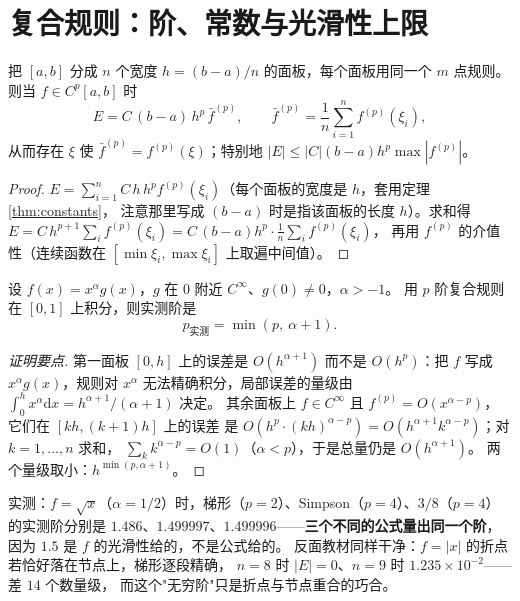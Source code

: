 \section{复合规则：阶、常数与光滑性上限}

\begin{theorem}[复合规则的误差]
\label{thm:composite}
把 $[a,b]$ 分成 $n$ 个宽度 $h=(b-a)/n$ 的面板，每个面板用同一个 $m$ 点规则。
则当 $f\in C^{p}[a,b]$ 时
\[
  E=C\,(b-a)\,h^{p}\,\bar f^{(p)},\qquad \bar f^{(p)}=\frac1n\sum_{i=1}^n f^{(p)}(\xi_i),
\]
从而存在 $\xi$ 使 $\bar f^{(p)}=f^{(p)}(\xi)$；特别地 $|E|\le |C|(b-a)h^p\max|f^{(p)}|$。
\end{theorem}

\begin{proof}
$E=\sum_{i=1}^n C\,h\,h^{p}f^{(p)}(\xi_i)$（每个面板的宽度是 $h$，套用定理 \ref{thm:constants}，
注意那里写成 $(b-a)$ 时是指该面板的长度 $h$）。求和得
$E=C\,h^{p+1}\sum_i f^{(p)}(\xi_i)=C\,(b-a)h^p\cdot\frac1n\sum_i f^{(p)}(\xi_i)$，
再用 $f^{(p)}$ 的介值性（连续函数在 $[\min\xi_i,\max\xi_i]$ 上取遍中间值）。
\end{proof}

\begin{theorem}
\label{thm:cap}
设 $f(x)=x^{\alpha}g(x)$，$g$ 在 $0$ 附近 $C^\infty$、$g(0)\ne0$，$\alpha>-1$。
用 $p$ 阶复合规则在 $[0,1]$ 上积分，则实测阶是
\[
  p_{\text{实测}}=\min(p,\ \alpha+1).
\]
\end{theorem}

\begin{proof}[证明要点]
第一面板 $[0,h]$ 上的误差是 $O(h^{\alpha+1})$ 而不是 $O(h^{p})$：把 $f$ 写成
$x^\alpha g(x)$，规则对 $x^\alpha$ 无法精确积分，局部误差的量级由
$\int_0^h x^\alpha\mathrm{d}x=h^{\alpha+1}/(\alpha+1)$ 决定。
其余面板上 $f\in C^\infty$ 且 $f^{(p)}=O(x^{\alpha-p})$，它们在 $[kh,(k+1)h]$ 上的误差
是 $O(h^{p}\cdot(kh)^{\alpha-p})=O(h^{\alpha+1}k^{\alpha-p})$；对 $k=1,\dots,n$ 求和，
$\sum_k k^{\alpha-p}=O(1)$（$\alpha<p$），于是总量仍是 $O(h^{\alpha+1})$。
两个量级取小：$h^{\min(p,\alpha+1)}$。
\end{proof}

实测：$f=\sqrt x$（$\alpha=1/2$）时，梯形（$p=2$）、Simpson（$p=4$）、$3/8$（$p=4$）
的实测阶分别是 $1.486$、$1.499997$、$1.499996$——\textbf{三个不同的公式量出同一个阶}，
因为 $1.5$ 是 $f$ 的光滑性给的，不是公式给的。
反面教材同样干净：$f=|x|$ 的折点若恰好落在节点上，梯形逐段精确，
$n=8$ 时 $|E|=0$、$n=9$ 时 $1.235\times10^{-2}$——差 $14$ 个数量级，
而这个"无穷阶"只是折点与节点重合的巧合。

